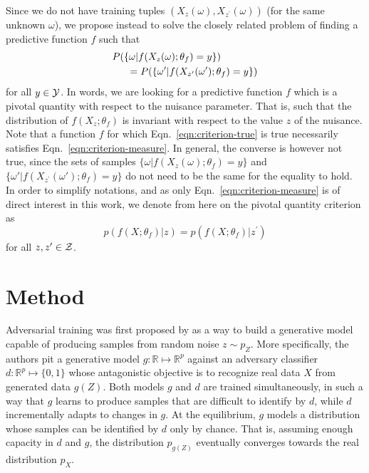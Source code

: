 \documentclass[twocolumn,superscriptaddress,aps]{revtex4-1}
\theoremstyle{plain}
\begin{document}
Since we do not have training tuples $(X_{z}(\omega),
X_{z^\prime}(\omega))$ (for the same unknown $\omega$), we propose instead to
solve the closely related problem of finding a predictive function $f$ such that
\begin{align}\label{eqn:criterion-measure}
    &P(\{ \omega | f(X_{z}(\omega) ; \theta_f) = y \} ) \nonumber \\
    &\indent = P( \{ \omega' | f(X_{z^\prime}(\omega') ; \theta_f) = y\})
\end{align}
for all $y \in {\cal Y}$. In words, we are looking for a predictive function $f$
which is a pivotal quantity \citep{degroot1986probability} with respect to the
nuisance parameter. That is, such that  the distribution of $f(X_z; \theta_f)$
is invariant with respect to the value $z$ of the nuisance. Note that a function
$f$ for which Eqn.~\ref{eqn:criterion-true} is true necessarily satisfies
Eqn.~\ref{eqn:criterion-measure}. In general, the converse is however not true,
since the sets of samples $\{ \omega | f(X_{z}(\omega); \theta_f) = y \}$ and $\{
\omega' | f(X_{z^\prime}(\omega'); \theta_f) = y \}$ do not need to be the same
for the equality to hold. In order to simplify notations, and as only
Eqn.~\ref{eqn:criterion-measure} is of direct interest in this work, we denote
from here on the pivotal quantity criterion as
\begin{equation}\label{eqn:criterion}
    p(f(X ; \theta_f) | z ) = p(f(X ; \theta_f) | z^\prime )
\end{equation}
for all $z,z^\prime \in  {\cal Z}$.



\section{Method}
\label{sec:method}

Adversarial training was first proposed by \citep{goodfellow2014generative} as a
way to build a generative model capable of producing samples from random noise
$z \sim p_Z$. More specifically, the authors pit a generative model $g:
\mathbb{R} \mapsto \mathbb{R}^p$ against an adversary classifier $d :
\mathbb{R}^p \mapsto \{ 0, 1\}$ whose antagonistic objective is to recognize
real data $X$ from generated data $g(Z)$. Both models $g$ and $d$ are trained
simultaneously, in such a way that $g$ learns to produce samples that are
difficult to identify by $d$, while $d$ incrementally adapts to changes in $g$.
At the equilibrium, $g$ models a distribution whose samples can be identified by
$d$ only by chance. That is, assuming enough capacity in $d$ and  $g$, the
distribution $p_{g(Z)}$ eventually converges towards the real distribution
$p_X$.
\end{document}
